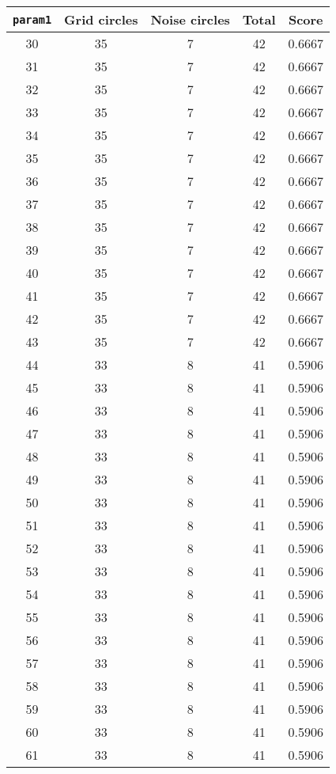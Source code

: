 \documentclass[letterpaper, 12pt]{article}
\begin{document}
\begin{longtable}{|c|c|c|c|c|}
\hline
\textbf{\texttt{param1}} & \textbf{Grid circles} & \textbf{Noise circles} & \textbf{Total} & \textbf{Score} \\
\hline
30 & 35 & 7 & 42 & 0.6667 \\
\hline
31 & 35 & 7 & 42 & 0.6667 \\
\hline
32 & 35 & 7 & 42 & 0.6667 \\
\hline
33 & 35 & 7 & 42 & 0.6667 \\
\hline
34 & 35 & 7 & 42 & 0.6667 \\
\hline
35 & 35 & 7 & 42 & 0.6667 \\
\hline
36 & 35 & 7 & 42 & 0.6667 \\
\hline
37 & 35 & 7 & 42 & 0.6667 \\
\hline
38 & 35 & 7 & 42 & 0.6667 \\
\hline
39 & 35 & 7 & 42 & 0.6667 \\
\hline
40 & 35 & 7 & 42 & 0.6667 \\
\hline
41 & 35 & 7 & 42 & 0.6667 \\
\hline
42 & 35 & 7 & 42 & 0.6667 \\
\hline
43 & 35 & 7 & 42 & 0.6667 \\
\hline
44 & 33 & 8 & 41 & 0.5906 \\
\hline
45 & 33 & 8 & 41 & 0.5906 \\
\hline
46 & 33 & 8 & 41 & 0.5906 \\
\hline
47 & 33 & 8 & 41 & 0.5906 \\
\hline
48 & 33 & 8 & 41 & 0.5906 \\
\hline
49 & 33 & 8 & 41 & 0.5906 \\
\hline
50 & 33 & 8 & 41 & 0.5906 \\
\hline
51 & 33 & 8 & 41 & 0.5906 \\
\hline
52 & 33 & 8 & 41 & 0.5906 \\
\hline
53 & 33 & 8 & 41 & 0.5906 \\
\hline
54 & 33 & 8 & 41 & 0.5906 \\
\hline
55 & 33 & 8 & 41 & 0.5906 \\
\hline
56 & 33 & 8 & 41 & 0.5906 \\
\hline
57 & 33 & 8 & 41 & 0.5906 \\
\hline
58 & 33 & 8 & 41 & 0.5906 \\
\hline
59 & 33 & 8 & 41 & 0.5906 \\
\hline
60 & 33 & 8 & 41 & 0.5906 \\
\hline
61 & 33 & 8 & 41 & 0.5906 \\

\end{longtable}
\end{document}
